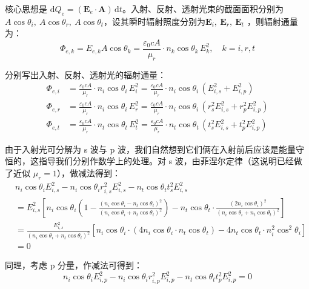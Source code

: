 \documentclass[UTF8]{report}
\theoremstyle{MyLineTheoremStyle} %
\theoremstyle{MyBlockTheoremStyle} %
\theoremstyle{MySubsubsectionStyle} %
\begin{document}
核心思想是 $\mathrm{d} Q_e = (\boldsymbol{E}_e \cdot \boldsymbol{A})\, \mathrm{d}t $。入射、反射、透射光束的截面面积分别为 $A \cos \theta_i,\ A \cos \theta_r,\ A \cos \theta_t$，设其瞬时辐射照度分别为$\boldsymbol{E}_i,\ \boldsymbol{E}_r,\ \boldsymbol{E}_t$ ，则辐射通量为：
\begin{equation}
\Phi_{e, k} = E_{e, k} A \cos \theta_k = \frac{\varepsilon_0 cA }{\mu_r}\cdot  n_k\cos \theta_k\,E_k^2,\quad  k = i, r, t
\end{equation}

分别写出入射、反射、透射光的辐射通量：
\begin{align}
\Phi_{e,i} &= \frac{\varepsilon_0 cA }{\mu_r} \cdot  n_i\cos \theta_i\,E_i^2 
= \frac{\varepsilon_0 cA }{\mu_r} \cdot  n_i\cos \theta_i\, \left( E_{i,s}^2 + E_{i,p}^2 \right) 
\\ 
\Phi_{e,r} 
&= \frac{\varepsilon_0 cA }{\mu_r} \cdot  n_i\cos \theta_i\,E_r^2 
= \frac{\varepsilon_0 cA }{\mu_r} \cdot  n_i\cos \theta_i\, \left( r_s^2E_{i,s}^2 + r_p^2E_{i,p}^2 \right) 
\\ 
\Phi_{e,t} 
&= \frac{\varepsilon_0 cA }{\mu_r} \cdot  n_t\cos \theta_t\,E_t^2 
= \frac{\varepsilon_0 cA }{\mu_r} \cdot  n_t \cos \theta_t \, \left( t_s^2E_{i,s}^2 + t_p^2E_{i,p}^2 \right) 
\end{align}

由于入射光可分解为 s 波与 p 波，我们自然想到它们俩在入射前后应该是能量守恒的，这指导我们分别作数学上的处理。对 s 波，由菲涅尔定律（这说明已经做了近似 $\mu_r = 1$），做减法得到：
\begin{align*}
&n_i \cos \theta_i E_{i,s}^2 - n_i \cos \theta_i r_{i,s}^2E_{i,s}^2 -   n_t \cos \theta_t t_s^2E_{i,s}^2 \\
&= E_{i,s}^2 \left[ n_i\cos \theta_i \left( 1 - \frac{(n_i\cos \theta_i - n_t \cos \theta_t)^2}{(n_i\cos \theta_i + n_t \cos \theta_t)^2} \right) - n_t \cos \theta_t \cdot \frac{(2n_i \cos \theta_i)^2}{(n_i\cos \theta_i + n_t \cos \theta_t)^2} \right] \\ 
& = \frac{E_{i,s}^2}{(n_i\cos \theta_i + n_t \cos \theta_t)^2} \left[ n_i \cos \theta_i \cdot (4 n_i\cos \theta_i \cdot n_t \cos \theta_t) - 4 n_t \cos \theta_t \cdot n_i^2 \cos^2 \theta_i\right] \\ 
& = 0
\end{align*}

同理，考虑 p 分量，作减法可得到：
\begin{equation*}
n_i \cos \theta_i E_{i,p}^2 - n_i \cos \theta_i r_{i,p}^2E_{i,p}^2 -   n_t \cos \theta_t t_p^2E_{i,p}^2 = 0
\end{equation*}
\end{document}
